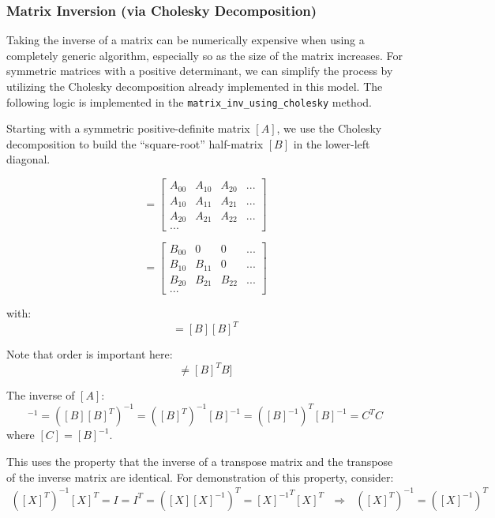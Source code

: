 \documentclass[11pt,fleqn]{report}
\begin{document}
\subsubsection{Matrix Inversion (via Cholesky Decomposition)}

Taking the inverse of a matrix can be numerically expensive when using a
completely generic algorithm, especially so as the size of the matrix
increases. For symmetric matrices with a positive determinant, we can simplify
the process by utilizing the Cholesky decomposition already implemented in
this model. The following logic is implemented in the 
\texttt{matrix\_inv\_using\_cholesky} method.

Starting with a symmetric positive-definite matrix $[A]$, we use the
Cholesky decomposition to build the ``square-root'' half-matrix $[B]$ in the
lower-left diagonal.


\begin{equation*}
[A] = \begin{bmatrix} A_{00} & A_{10} & A_{20} & ... \\
A_{10} & A_{11} & A_{21} & ... \\
A_{20} & A_{21} & A_{22} & ... \\
 ...
\end{bmatrix}
\end{equation*}

\begin{equation*}
[B] = \begin{bmatrix} B_{00} &0 &0 & ... \\
B_{10} & B_{11} &0 & ... \\
B_{20} & B_{21} & B_{22} & ... \\
 ...
\end{bmatrix}
\end{equation*}

with:
\begin{equation*}
[A] = [B] [B]^T
\end{equation*}

Note that order is important here:
\begin{equation*}
[A] \neq [B]^T B]
\end{equation*}

The inverse of $[A]$:
\begin{equation*}
[A]^{-1} = ([B] [B]^T)^{-1} = ([B]^T)^{-1} [B]^{-1} = ([B]^{-1})^T
[B]^{-1} = C^T C
\end{equation*}
where $[C] = [B]^{-1}$.

This uses the property that the inverse of a
transpose matrix and the transpose of the inverse matrix are identical. For
demonstration of this property, consider:
\begin{align*}
([X]^T)^{-1}[X]^T = I = I^T = ([X] [X]^{-1})^T = {[X]^{-1}}^T [X]^T
~~~\Rightarrow~~~ ([X]^T)^{-1}=([X]^{-1})^T
\end{align*}
\end{document}
